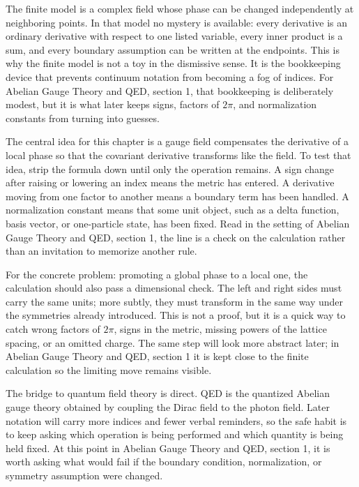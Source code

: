 The finite model is a complex field whose phase can be changed independently at neighboring points.  In that model no mystery is available: every derivative is an ordinary derivative with respect to one listed variable, every inner product is a sum, and every boundary assumption can be written at the endpoints.  This is why the finite model is not a toy in the dismissive sense.  It is the bookkeeping device that prevents continuum notation from becoming a fog of indices.  For Abelian Gauge Theory and QED, section 1, that bookkeeping is deliberately modest, but it is what later keeps signs, factors of \(2\pi\), and normalization constants from turning into guesses.

The central idea for this chapter is a gauge field compensates the derivative of a local phase so that the covariant derivative transforms like the field.  To test that idea, strip the formula down until only the operation remains.  A sign change after raising or lowering an index means the metric has entered.  A derivative moving from one factor to another means a boundary term has been handled.  A normalization constant means that some unit object, such as a delta function, basis vector, or one-particle state, has been fixed.  Read in the setting of Abelian Gauge Theory and QED, section 1, the line is a check on the calculation rather than an invitation to memorize another rule.

For the concrete problem: promoting a global phase to a local one, the calculation should also pass a dimensional check.  The left and right sides must carry the same units; more subtly, they must transform in the same way under the symmetries already introduced.  This is not a proof, but it is a quick way to catch wrong factors of \(2\pi\), signs in the metric, missing powers of the lattice spacing, or an omitted charge.  The same step will look more abstract later; in Abelian Gauge Theory and QED, section 1 it is kept close to the finite calculation so the limiting move remains visible.

The bridge to quantum field theory is direct.  QED is the quantized Abelian gauge theory obtained by coupling the Dirac field to the photon field.  Later notation will carry more indices and fewer verbal reminders, so the safe habit is to keep asking which operation is being performed and which quantity is being held fixed.  At this point in Abelian Gauge Theory and QED, section 1, it is worth asking what would fail if the boundary condition, normalization, or symmetry assumption were changed.

